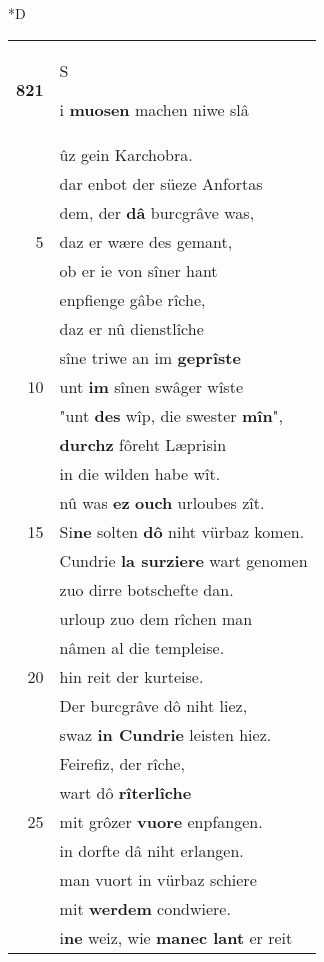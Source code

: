 \documentclass[8pt,a4paper,notitlepage]{article}
\begin{document}
\begin{table}[ht]
\begin{minipage}[t]{0.5\linewidth}
\small
\begin{center}*D
\end{center}
\begin{tabular}{rl}
\textbf{821} & \begin{large}S\end{large}i \textbf{muosen} machen niwe slâ\\ 
 & ûz gein Karchobra.\\ 
 & dar enbot der süeze Anfortas\\ 
 & dem, der \textbf{dâ} burcgrâve was,\\ 
5 & daz er wære des gemant,\\ 
 & ob er ie von sîner hant\\ 
 & enpfienge gâbe rîche,\\ 
 & daz er nû dienstlîche\\ 
 & sîne triwe an im \textbf{geprîste}\\ 
10 & unt \textbf{im} sînen swâger wîste\\ 
 & "unt \textbf{des} wîp, die swester \textbf{mîn}",\\ 
 & \textbf{durchz} fôreht Læprisin\\ 
 & in die wilden habe wît.\\ 
 & nû was \textbf{ez} \textbf{ouch} urloubes zît.\\ 
15 & Si\textbf{ne} solten \textbf{dô} niht vürbaz komen.\\ 
 & Cundrie \textbf{la surziere} wart genomen\\ 
 & zuo dirre botschefte dan.\\ 
 & urloup zuo dem rîchen man\\ 
 & nâmen al die templeise.\\ 
20 & hin reit der kurteise.\\ 
 & Der burcgrâve dô niht liez,\\ 
 & swaz \textbf{in Cundrie} leisten hiez.\\ 
 & Feirefiz, der rîche,\\ 
 & wart dô \textbf{rîterlîche}\\ 
25 & mit grôzer \textbf{vuore} enpfangen.\\ 
 & in dorfte dâ niht erlangen.\\ 
 & man vuort in vürbaz schiere\\ 
 & mit \textbf{werdem} condwiere.\\ 
 & i\textbf{ne} weiz, wie \textbf{manec lant} er reit\\ 

\end{tabular}
\end{minipage}
\end{table}
\end{document}
